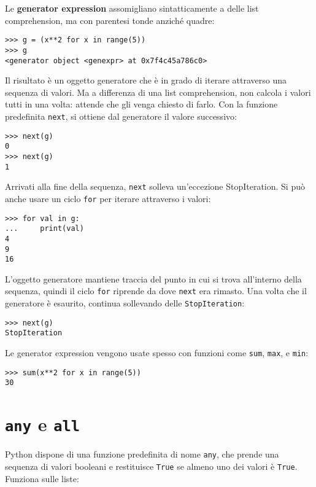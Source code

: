 \documentclass[10pt]{book}
\begin{document}
Le {\bf generator expression} assomigliano sintatticamente a delle list comprehension, ma con parentesi tonde anziché quadre:

\begin{verbatim}
>>> g = (x**2 for x in range(5))
>>> g
<generator object <genexpr> at 0x7f4c45a786c0>
\end{verbatim}
%
Il risultato è un oggetto generatore che è in grado di iterare attraverso una sequenza di valori. Ma a differenza di una list comprehension, non calcola i valori tutti in una volta: attende che gli venga chiesto di farlo.
Con la funzione predefinita {\tt next}, si ottiene dal generatore il valore successivo:

\begin{verbatim}
>>> next(g)
0
>>> next(g)
1
\end{verbatim}
%
Arrivati alla fine della sequenza, {\tt next} solleva un'eccezione
StopIteration.  Si può anche usare un ciclo {\tt for} per iterare attraverso i valori:

\begin{verbatim}
>>> for val in g:
...     print(val)
4
9
16
\end{verbatim}
%
L'oggetto generatore mantiene traccia del punto in cui si trova all'interno della sequenza, quindi il ciclo {\tt for} riprende da dove {\tt next} era rimasto. Una volta che il generatore è esaurito, continua sollevando delle {\tt StopIteration}:

\begin{verbatim}
>>> next(g)
StopIteration
\end{verbatim}

Le generator expression vengono usate spesso con funzioni come {\tt sum},
{\tt max}, e {\tt min}:

\begin{verbatim}
>>> sum(x**2 for x in range(5))
30
\end{verbatim}


\section{{\tt any} e {\tt all}}

Python dispone di una funzione predefinita di nome {\tt any}, che prende una sequenza di valori booleani e restituisce {\tt True} se almeno uno dei valori è {\tt True}.  Funziona sulle liste:
\end{document}
